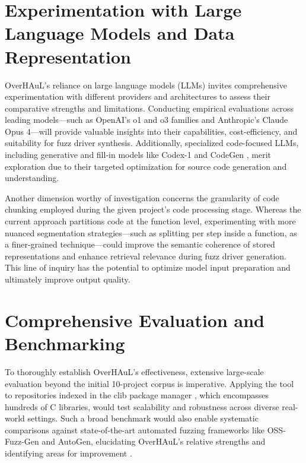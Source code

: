 \documentclass[
  a4paper,
  DIV=11,
  numbers=noendperiod]{scrreprt}
\theoremstyle{definition}
\theoremstyle{remark}
\begin{document}
\section{Experimentation with Large Language Models and Data
Representation}\label{experimentation-with-large-language-models-and-data-representation}

OverHAuL's reliance on large language models (LLMs) invites
comprehensive experimentation with different providers and architectures
to assess their comparative strengths and limitations. Conducting
empirical evaluations across leading models---such as OpenAI's o1 and o3
families and Anthropic's Claude Opus 4---will provide valuable insights
into their capabilities, cost-efficiency, and suitability for fuzz
driver synthesis. Additionally, specialized code-focused LLMs, including
generative and fill-in models like Codex-1 and CodeGen
\autocite{nijkamp2023a,nijkamp2023,openai2025a}, merit exploration due
to their targeted optimization for source code generation and
understanding.

Another dimension worthy of investigation concerns the granularity of
code chunking employed during the given project's code processing stage.
Whereas the current approach partitions code at the function level,
experimenting with more nuanced segmentation strategies---such as
splitting per step inside a function, as a finer-grained
technique---could improve the semantic coherence of stored
representations and enhance retrieval relevance during fuzz driver
generation. This line of inquiry has the potential to optimize model
input preparation and ultimately improve output quality.

\section{Comprehensive Evaluation and
Benchmarking}\label{comprehensive-evaluation-and-benchmarking}

To thoroughly establish OverHAuL's effectiveness, extensive large-scale
evaluation beyond the initial 10-project corpus is imperative. Applying
the tool to repositories indexed in the clib package manager
\autocite{clibs}, which encompasses hundreds of C libraries, would test
scalability and robustness across diverse real-world settings. Such a
broad benchmark would also enable systematic comparisons against
state-of-the-art automated fuzzing frameworks like OSS-Fuzz-Gen and
AutoGen, elucidating OverHAuL's relative strengths and identifying areas
for improvement \autocite{oss-fuzz-gen,sun2024}.
\end{document}
